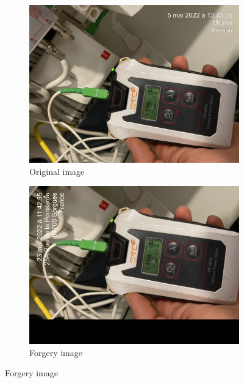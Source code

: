 \begin{figure}[H]
    \centering
    \begin{subfigure}{0.4\textwidth}
        \includegraphics[width=\linewidth]{images/true_positif/t1_true_positif.jpg}
        \caption{Original image}
        \label{fig:true_positif_1}
    \end{subfigure}
    \begin{subfigure}{0.4\textwidth}
        \includegraphics[width=\linewidth]{images/true_positif/t2_true_positif.jpg}
        \caption{Forgery image}
        \label{fig:true_positif_2}
    \end{subfigure}
\end{figure}

